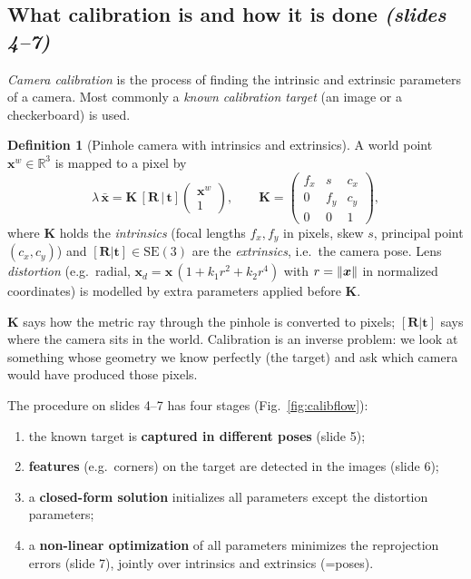 \documentclass[11pt,a4paper]{article}
\newcommand{\slr}[1]{\texorpdfstring{\emph{(slides #1)}}{(slides #1)}}
\newcommand{\R}{\mathbb{R}}
\newcommand{\xb}{\bar{\bm{x}}}
\newcommand{\SE}{\mathrm{SE}(3)}
\theoremstyle{definition}
\newtheorem{definition}{Definition}[section]
\theoremstyle{plain}
\theoremstyle{remark}
\begin{document}
\subsection{What calibration is and how it is done \slr{4--7}}
\emph{Camera calibration} is the process of finding the intrinsic and extrinsic parameters of a
camera. Most commonly a \emph{known calibration target} (an image or a checkerboard) is used.

\begin{definition}[Pinhole camera with intrinsics and extrinsics]\label{def:pinhole}
A world point $\bm x^w\in\R^3$ is mapped to a pixel by
\[
\lambda\,\xb=\bm K\,[\bm R\,|\,\bm t]\begin{pmatrix}\bm x^w\\1\end{pmatrix},\qquad
\bm K=\begin{pmatrix}f_x&s&c_x\\0&f_y&c_y\\0&0&1\end{pmatrix},
\]
where $\bm K$ holds the \emph{intrinsics} (focal lengths $f_x,f_y$ in pixels, skew $s$, principal
point $(c_x,c_y)$) and $[\bm R|\bm t]\in\SE$ are the \emph{extrinsics}, i.e.\ the camera pose.
Lens \emph{distortion} (e.g.\ radial, $\bm x_d=\bm x\,(1+k_1r^2+k_2r^4)$ with $r=\lVert \bm x\rVert$ in
normalized coordinates) is modelled by extra parameters applied before $\bm K$.
\end{definition}

\begin{intuition}
$\bm K$ says how the metric ray through the pinhole is converted to pixels; $[\bm R|\bm t]$ says where the
camera sits in the world. Calibration is an inverse problem: we look at something whose geometry we
know perfectly (the target) and ask which camera would have produced those pixels.
\end{intuition}

The procedure on slides 4--7 has four stages (Fig.~\ref{fig:calibflow}):
\begin{enumerate}
\item the known target is \textbf{captured in different poses} (slide 5);
\item \textbf{features} (e.g.\ corners) on the target are detected in the images (slide 6);
\item a \textbf{closed-form solution} initializes all parameters except the distortion parameters;
\item a \textbf{non-linear optimization} of all parameters minimizes the reprojection errors
 (slide 7), jointly over intrinsics and extrinsics (=poses).
\end{enumerate}
\end{document}
